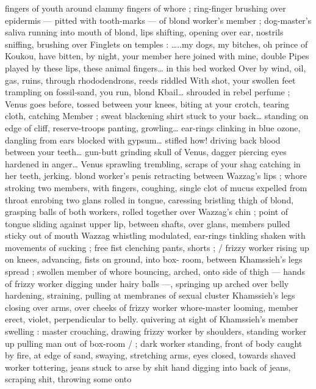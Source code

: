 fingers of youth around clammy fingers of whore ; ring-finger 
brushing over epidermis --- pitted with tooth-marks --- of blond 
worker's member ; dog-master's saliva running into mouth of blond, 
lips shifting, opening over ear, nostrils sniffing, brushing over 
Finglets on temples : {\gl}{\ldots}..my dogs, my bitches, oh prince of Koukou, 
have bitten, by night, your member here joined with mine, double 
Pipes played by these lips, these animal fingers{\ldots} in this bed worked 
Over by wind, oil, gas, ruins, through rhododendrons, reeds riddled 
With shot, your swollen feet trampling on fossil-sand, you run, blond 
Kbail{\ldots} shrouded in rebel perfume ; Venus goes before, tossed 
between your knees, biting at your crotch, tearing cloth, catching 
Member ; sweat blackening shirt stuck to your back{\ldots} standing on 
edge of cliff, reserve-troops panting, growling{\ldots} ear-rings clinking in 
blue ozone, dangling from ears blocked with gypsum{\ldots} stifled how! 
driving back blood between your teeth{\ldots} gun-butt grinding skull of 
Venus, dagger piercing eyes hardened in anger{\ldots} Venus sprawling 
trembling, scraps of your shag catching in her teeth, jerking.{\gr} 
blond worker's penis retracting between Wazzag's lips ; whore 
stroking two members, with fingers, coughing, single clot of mucus 
expelled from throat enrobing two glans rolled in tongue, caressing 
bristling thigh of blond, grasping balls of both workers, rolled 
together over Wazzag's chin ; point of tongue sliding against upper 
lip, between shafts, over glans, members pulled sticky out of mouth 
Wazzag whistling modulated, ear-rings tinkling shaken with 
movements of sucking ; free fist clenching pants, shorts ; {\slash} frizzy 
worker rising up on knees, advancing, fists on ground, into box- 
room, between Khamssieh's legs spread ; swollen member of whore 
bouncing, arched, onto side of thigh --- hands of frizzy worker 
digging under hairy balls ---, springing up arched over belly 
hardening, straining, pulling at membranes of sexual cluster 
Khamssieh's legs closing over arms, over cheeks of frizzy worker 
whore-master looming, member erect, violet, perpendicular to belly. 
quivering at sight of Khamssieh's member swelling : master 
crouching, drawing frizzy worker by shoulders, standing worker up 
pulling man out of box-room {\slash} ; dark worker standing, front of body 
caught by fire, at edge of sand, swaying, stretching arms, eyes 
closed, towards shaved worker tottering, jeans stuck to arse by shit 
hand digging into back of jeans, scraping shit, throwing some onto 
